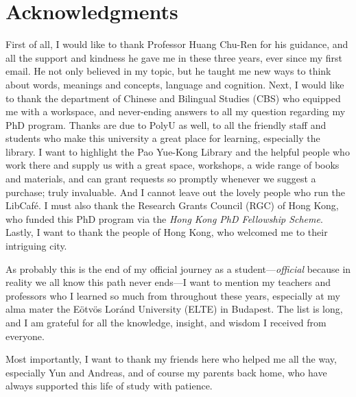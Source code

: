 \chapter*{Acknowledgments}
\label{ch:acknowledgments}


First of all, I would like to thank Professor Huang Chu-Ren for his guidance, and all the support and kindness he gave me in these three years, ever since my first email. He not only believed in my topic, but he taught me new ways to think about words, meanings and concepts, language and cognition. Next, I would like to thank the department of Chinese and Bilingual Studies (CBS) who equipped me with a workspace, and never-ending answers to all my question regarding my PhD program. Thanks are due to PolyU as well, to all the friendly staff and students who make this university a great place for learning, especially the library. I want to highlight the Pao Yue-Kong Library and the helpful people who work there and supply us with a great space, workshops, a wide range of books and materials, and can grant requests so promptly whenever we suggest a purchase; truly invaluable. And I cannot leave out the lovely people who run the LibCafé. I must also thank the Research Grants Council (RGC) of Hong Kong, who funded this PhD program via the \textit{Hong Kong PhD Fellowship Scheme}. Lastly, I want to thank the people of Hong Kong, who welcomed me to their intriguing city.


As probably this is the end of my official journey as a student---\textit{official} because in reality we all know this path never ends---I want to mention my teachers and professors who I learned so much from throughout these years, especially at my alma mater the Eötvös Loránd University (ELTE) in Budapest. The list is long, and I am grateful for all the knowledge, insight, and wisdom I received from everyone.


Most importantly, I want to thank my friends here who helped me all the way, especially Yun and Andreas, and of course my parents back home, who have always supported this life of study with patience.
